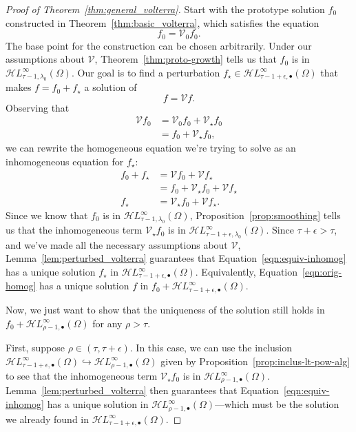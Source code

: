 \documentclass{article}
\theoremstyle{plain}
\newcommand{\singexp}[2]{\mathcal{H}L^\infty_{#1, #2}}
\newcommand{\singexpalg}[1]{\singexp{#1}{\bullet}}
\newcommand{\volterra}{\mathcal{V}}
\newcommand{\hardpart}{\mathcal{V}_0}
\newcommand{\softpart}{\mathcal{V}_\star}
\newcommand{\hardker}{k_0}
\newcommand{\solwhole}{f}
\newcommand{\solproto}{f_0}
\newcommand{\solptb}{f_\star}
\begin{document}
\begin{proof}[Proof of Theorem~\ref{thm:general_volterra}]
Start with the prototype solution $\solproto$ constructed in Theorem~\ref{thm:basic_volterra}, which satisfies the equation
\[ \solproto = \hardpart \solproto. \]
The base point for the construction can be chosen arbitrarily. Under our assumptions about $\volterra$, Theorem~\ref{thm:proto-growth} tells us that $\solproto$ is in $\singexp{\tau-1}{\lambda_0}(\Omega)$. Our goal is to find a perturbation $\solptb \in \singexpalg{\tau-1+\epsilon}(\Omega)$ that makes $\solwhole = \solproto + \solptb$ a solution of
\begin{equation}\label{eqn:orig-homog}
\solwhole = \volterra \solwhole.
\end{equation}
Observing that
\begin{align*}
\volterra \solproto & = \hardpart\solproto + \softpart\solproto \\
& = \solproto + \softpart \solproto,
\end{align*}
we can rewrite the homogeneous equation we're trying to solve as an inhomogeneous equation for $\solptb$:
\begin{align}
\solproto + \solptb & = \volterra\solproto + \volterra\solptb \nonumber \\
& = \solproto + \softpart\solproto + \volterra\solptb \nonumber \\
\solptb & = \softpart\solproto + \volterra\solptb. \label{eqn:equiv-inhomog}
\end{align}
Since we know that $\solproto$ is in $\singexp{\tau-1}{\lambda_0}(\Omega)$, Proposition~\ref{prop:smoothing} tells us that the inhomogeneous term $\softpart\solproto$ is in $\singexp{\tau-1+\epsilon}{\lambda_0}(\Omega)$. Since $\tau+\epsilon > \tau$, and we've made all the necessary assumptions about $\volterra$, Lemma~\ref{lem:perturbed_volterra} guarantees that Equation~\eqref{eqn:equiv-inhomog} has a unique solution $\solptb$ in $\singexpalg{\tau-1+\epsilon}(\Omega)$. Equivalently, Equation~\eqref{eqn:orig-homog} has a unique solution $f$ in $f_0 + \singexpalg{\tau-1+\epsilon}(\Omega)$.

Now, we just want to show that the uniqueness of the solution still holds in $f_0 + \singexpalg{\rho-1}(\Omega)$ for any $\rho > \tau$.

First, suppose $\rho \in (\tau, \tau+\epsilon)$. In this case, we can use the inclusion $\singexpalg{\tau-1+\epsilon}(\Omega) \hookrightarrow \singexpalg{\rho-1}(\Omega)$ given by Proposition~\ref{prop:inclus-lt-pow-alg} to see that the inhomogeneous term $\softpart\solproto$ is in $\singexpalg{\rho-1}(\Omega)$. Lemma~\ref{lem:perturbed_volterra} then guarantees that Equation~\eqref{eqn:equiv-inhomog} has a unique solution in $\singexpalg{\rho-1}(\Omega)$---which must be the solution we already found in $\singexpalg{\tau-1+\epsilon}(\Omega)$.


\end{proof}
\end{document}
